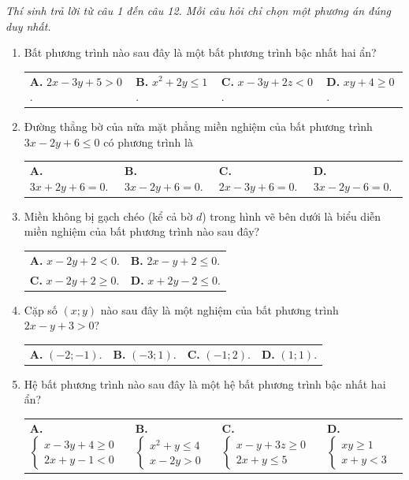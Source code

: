 \documentclass[12pt,a4paper]{article}
\makeatletter
\newcommand{\parttitle}[1]{\par\vspace{2pt}{\large\bfseries\color{ink}#1}\par\vspace{1pt}}
\newcommand{\four}[4]{\par\noindent\begin{tabularx}{\linewidth}{@{}*{4}{>{\raggedright\arraybackslash}X}@{}}\textbf{A.} #1&\textbf{B.} #2&\textbf{C.} #3&\textbf{D.} #4\end{tabularx}}
\newcommand{\two}[4]{\par\noindent\begin{tabularx}{\linewidth}{@{}*{2}{>{\raggedright\arraybackslash}X}@{}}\textbf{A.} #1&\textbf{B.} #2\\[2pt]\textbf{C.} #3&\textbf{D.} #4\end{tabularx}}
\makeatother
\begin{document}
\parttitle{PHẦN I. Trắc nghiệm nhiều lựa chọn}
\textit{Thí sinh trả lời từ câu 1 đến câu 12. Mỗi câu hỏi chỉ chọn một phương án đúng duy nhất.}
\begin{enumerate}
\item Bất phương trình nào sau đây là một bất phương trình bậc nhất hai ẩn?
\four{$2x - 3y + 5 > 0$.}{$x^2 + 2y \le 1$.}{$x - 3y + 2z < 0$.}{$xy + 4 \ge 0$.}

\item Đường thẳng bờ của nửa mặt phẳng miền nghiệm của bất phương trình $3x - 2y + 6 \le 0$ có phương trình là
\four{$3x + 2y + 6 = 0$.}{$3x - 2y + 6 = 0$.}{$2x - 3y + 6 = 0$.}{$3x - 2y - 6 = 0$.}

\item Miền không bị gạch chéo (kể cả bờ $d$) trong hình vẽ bên dưới là biểu diễn miền nghiệm của bất phương trình nào sau đây?

\begin{center}
\end{center}

\two{$x - 2y + 2 < 0$.}{$2x - y + 2 \le 0$.}{$x - 2y + 2 \ge 0$.}{$x + 2y - 2 \le 0$.}

\item Cặp số $(x; y)$ nào sau đây là một nghiệm của bất phương trình $2x - y + 3 > 0$?
\four{$(-2; -1)$.}{$(-3; 1)$.}{$(-1; 2)$.}{$(1; 1)$.}

\item Hệ bất phương trình nào sau đây là một hệ bất phương trình bậc nhất hai ẩn?
\four{$\begin{cases} x - 3y + 4 \ge 0 \\ 2x + y - 1 < 0 \end{cases}$}{$\begin{cases} x^2 + y \le 4 \\ x - 2y > 0 \end{cases}$}{$\begin{cases} x - y + 3z \ge 0 \\ 2x + y \le 5 \end{cases}$}{$\begin{cases} xy \ge 1 \\ x + y < 3 \end{cases}$}


\end{enumerate}
\end{document}
